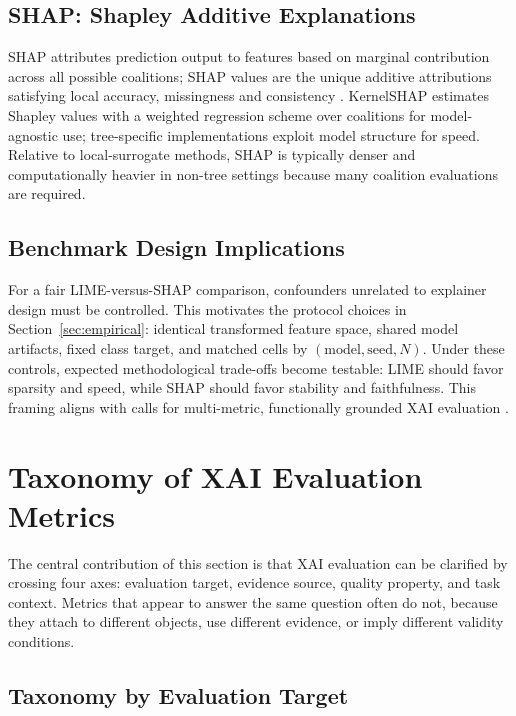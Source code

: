 \documentclass[10pt]{article}
\begin{document}
\subsection{SHAP: Shapley Additive Explanations}

SHAP attributes prediction output to features based on marginal
contribution across all possible coalitions; SHAP values are the unique
additive attributions satisfying local accuracy, missingness and consistency
\citep{lundberg2017unified}. KernelSHAP
estimates Shapley values with a weighted regression scheme over coalitions
for model-agnostic use; tree-specific implementations exploit model
structure for speed. Relative to local-surrogate methods, SHAP is
typically denser and computationally heavier in non-tree settings because
many coalition evaluations are required.

\subsection{Benchmark Design Implications}

For a fair LIME-versus-SHAP comparison, confounders unrelated to explainer
design must be controlled. This motivates the protocol choices in
Section~\ref{sec:empirical}: identical transformed feature space, shared
model artifacts, fixed class target, and matched cells by
$(\mathrm{model}, \mathrm{seed}, N)$. Under these controls, expected
methodological trade-offs become testable: LIME should favor sparsity and
speed, while SHAP should favor stability and faithfulness. This framing
aligns with calls for multi-metric, functionally grounded XAI evaluation
\citep{pawlicki2024metrics,canha2025benchmark}.

\section{Taxonomy of XAI Evaluation Metrics}
\label{sec:taxonomy}

The central contribution of this section is that XAI evaluation can be
clarified by crossing four axes: evaluation target, evidence source,
quality property, and task context. Metrics that appear to answer the
same question often do not, because they attach to different objects, use
different evidence, or imply different validity conditions.

\subsection{Taxonomy by Evaluation Target}
\end{document}
